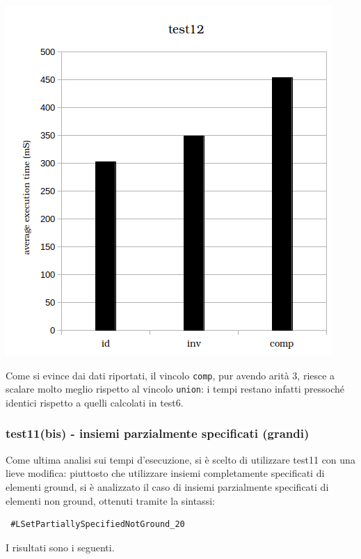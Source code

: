 \begin{center}
\includegraphics[scale=0.8]{images/histogram_test12.png}
\end{center}

Come si evince dai dati riportati, il vincolo \texttt{comp}, pur avendo arità 3, riesce a scalare molto meglio rispetto al vincolo \texttt{union}: i tempi restano infatti pressoché identici rispetto a quelli calcolati in test6.\\

\subsubsection{test11(bis) - insiemi parzialmente specificati (grandi)}
Come ultima analisi sui tempi d'esecuzione, si è scelto di utilizzare test11 con una lieve modifica: piuttosto che utilizzare insiemi completamente specificati di elementi ground, si è analizzato il caso di insiemi parzialmente specificati di elementi non ground, ottenuti tramite la sintassi:
\begin{verbatim} #LSetPartiallySpecifiedNotGround_20
\end{verbatim}

I risultati sono i seguenti.\\


